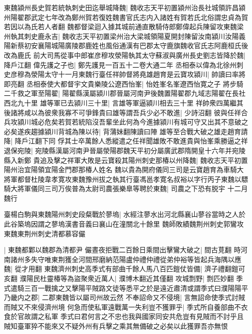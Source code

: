 東魏潁州長史賀若統執刺史田迄舉城降魏|{
	魏收志天平初置潁州治長社城領許昌潁州陽翟郡武定七年改為鄭州賀若復姓魏書官氏志内入諸姓有賀若氏北俗謂忠貞為賀若因以為氏若人者翻}
魏都督梁迴入據其城前通直散騎侍郎鄭偉起兵陳留攻東魏梁州執其刺史鹿永吉|{
	魏收志天平初置梁州治大梁城領陽夏開封陳留汝南潁川汝陽義陽新蔡初安襄陽城陽廣陵郡鹿姓也風俗通漢有巴郡太守鹿旗魏收官氏志阿鹿桓氏後改為鹿氏}
前大司馬從事中郎崔彦穆攻滎陽執其太守蘇淑與廣州長史劉志皆降於魏|{
	降戶江翻}
偉先護之子也|{
	鄭先護見一百五十二卷大通二年}
丞相泰以偉為北徐州刺史彦穆為滎陽太守十一月東魏行臺任祥帥督將堯雄趙育是云寶攻潁川|{
	帥讀曰率將即亮翻}
丞相泰使大都督宇文貴樂陵公遼西怡峯|{
	怡姓峯名峯遼西怡寛之子}
將步騎二千救之軍至陽翟|{
	陽翟縣漢屬潁川郡晉屬河南尹後魏置陽翟郡九域志陽翟在長社西北九十里}
雄等軍已去潁川三十里|{
	言雄等軍逼潁川相去三十里}
祥帥衆四萬繼其後諸將咸以為彼衆我寡不可爭鋒貴曰雄等謂吾兵少必不敢進|{
	少詩沼翻}
彼與任祥合兵攻潁川城必危矣若賀若統陷沒吾輩坐此何為今進據潁川有城可守又出其不意破之必矣遂疾趨據潁川背城為陳以待|{
	背蒲妹翻陳讀曰陣}
雄等至合戰大破之雄走趙育請降|{
	降戶江翻下同}
俘其士卒萬餘人悉縱遣之任祥聞雄敗不敢進貴與怡峯乘勝逼之祥退保宛陵|{
	宛陵縣漢屬河南尹晉屬滎陽郡魏天平初分屬廣武郡隋開皇十六年并宛陵縣入新鄭}
貴追及擊之祥軍大敗是云寶殺其陽州刺史那椿以州降魏|{
	魏收志天平初置陽州治宜陽領宜陽金門郡那椿人姓名}
魏以貴為開府儀同三司是云寶趙育為車騎大將軍都督杜陵韋孝寛攻東魏豫州拔之執其行臺馮邕孝寛名叔裕以字行丙子東魏以驃騎大將軍儀同三司万俟普為太尉司農張樂臯等聘於東魏|{
	司農之下恐有脱宇}
十二月魏行

臺楊白駒與東魏陽州刺史段粲戰於蓼塢|{
	水經注蓼水出河北縣襄山蓼谷當時之人於此谷築塢因謂之蓼塢漢書音義曰襄山在潼關北十餘里}
魏師敗績魏荆州刺史郭鸞攻東魏東荆州刺史清都慕容儼

|{
	東魏都鄴以魏郡為清都尹}
儼晝夜拒戰二百餘日乘間出擊鸞大破之|{
	間古莧翻}
時河南諸州多失守唯東荆獲全河間邢磨納范陽盧仲禮仲禮從弟仲裕等皆起兵海隅以應魏|{
	從才用翻}
東魏濟州刺史高季式有部曲千餘人馬八百匹鎧仗皆備|{
	濟子禮翻鎧可亥翻}
濮陽民杜靈椿等為盜聚衆近萬人|{
	濮博木翻近其僅翻}
攻城剽野|{
	剽匹妙翻}
季式遣騎三百一戰擒之又擊陽平賊路文徒等悉平之於是遠近肅清或謂季式曰濮陽陽平乃畿内之郡|{
	二郡東魏皆以屬司州故云然}
不奉詔命又不侵境|{
	言無詔命使季式討賊而賊又不來侵濟州境}
何急而使私軍遠戰萬一失利豈不獲罪乎|{
	季式所自養部曲不衣食於官故謂之私軍}
季式曰君何言之不忠也我與國家同安共危豈有見賊而不討乎且賊知臺軍猝不能來又不疑外州有兵擊之乘其無備破之必矣以此獲罪吾亦無恨

